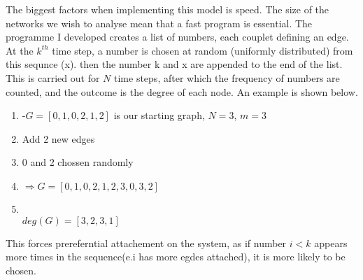 \documentclass[]{article}
\begin{document}
The biggest factors when implementing this model is speed. The size of the networks we wish to analyse mean that a fast program is essential. The programme I developed creates a list of numbers, each couplet defining an edge. At the $k^{th}$ time step, a number is chosen at random (uniformly distributed) from this sequnce (x). then the number k and x are appended to the end of the list. This is carried out for $N$ time steps, after which the frequency of numbers are counted, and the outcome is the degree of each node. An example is shown below. \\
\begin{enumerate}
\item -$G=[0,1,0,2,1,2]$ is our starting graph, $N=3$, $m=3$
\item Add 2 new edges
\item 0 and 2 chossen randomly
\item $\Rightarrow G=[0,1,0,2,1,2,3,0,3,2]$
\item {}\\ $deg(G)=[3,2,3,1]$
\end{enumerate}
This forces prereferntial attachement on the system, as if number $i<k$ appears more times in the sequence(e.i has more egdes attached), it is more likely to be chosen.
\end{document}
